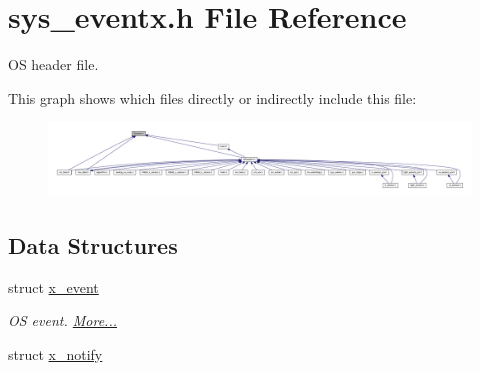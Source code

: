 \hypertarget{a00036}{\section{sys\+\_\+eventx.\+h File Reference}
\label{a00036}
}


O\+S header file.  


This graph shows which files directly or indirectly include this file\+:\nopagebreak
\begin{figure}[H]
\begin{center}
\leavevmode
\includegraphics[width=350pt]{d9/dc5/a01705}
\end{center}
\end{figure}
\subsection*{Data Structures}
\begin{DoxyCompactItemize}
\item 
struct \hyperlink{a00036_de/d37/a00849}{x\+\_\+event}
\begin{DoxyCompactList}\small\item\em O\+S event.  \hyperlink{a00036_de/d37/a00849}{More...}\end{DoxyCompactList}\item 
struct \hyperlink{a00036_df/d4c/a00851}{x\+\_\+notify}
\end{DoxyCompactItemize}
